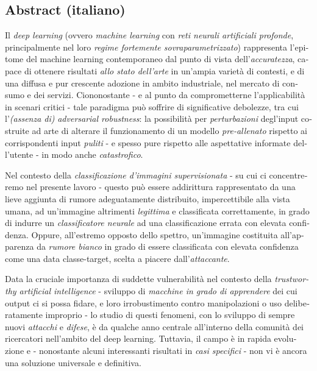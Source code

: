 
\begin{otherlanguage}{italian}

\newpage
\subsection{Abstract (italiano)}

Il \textit{deep learning} (ovvero \textit{machine learning} con \textit{reti neurali artificiali profonde}, principalmente nel loro \textit{regime fortemente sovraparametrizzato}) rappresenta l'epitome del machine learning contemporaneo dal punto di vista dell'\textit{accuratezza}, capace di ottenere risultati \textit{allo stato dell'arte} in un'ampia varietà di contesti, e di una diffusa e pur crescente adozione in ambito industriale, nel mercato di consumo e dei servizi. Ciononostante - e al punto da comprometterne l'applicabilità in scenari critici - tale paradigma può soffrire di significative debolezze, tra cui l'\textit{(assenza di)} \textit{adversarial robustness}: la possibilità per \textit{perturbazioni} degl'input costruite ad arte di alterare il funzionamento di un modello \textit{pre-allenato} rispetto ai corrispondenti input \textit{puliti} - e spesso pure rispetto alle aspettative informate dell'utente - in modo anche \textit{catastrofico}.

Nel contesto della \textit{classificazione d'immagini supervisionata} - su cui ci concentreremo nel presente lavoro - questo può essere addirittura rappresentato da una lieve aggiunta di rumore adeguatamente distribuito, impercettibile alla vista umana, ad un'immagine altrimenti \textit{legittima} e classificata correttamente, in grado di indurre un \textit{classificatore neurale} ad una classificazione errata con elevata confidenza. Oppure, all'estremo opposto dello spettro, un'immagine costituita all'apparenza da \textit{rumore bianco} in grado di essere classificata con elevata confidenza come una data classe-target, scelta a piacere dall'\textit{attaccante}.

Data la cruciale importanza di suddette vulnerabilità nel contesto della \textit{trustworthy artificial intelligence} - sviluppo di \textit{macchine in grado di apprendere} dei cui output ci si possa fidare, e loro irrobustimento contro manipolazioni o uso deliberatamente improprio - lo studio di questi fenomeni, con lo sviluppo di sempre nuovi \textit{attacchi} e \textit{difese}, è da qualche anno centrale all'interno della comunità dei ricercatori nell'ambito del deep learning. Tuttavia, il campo è in rapida evoluzione e - nonostante alcuni interessanti risultati in \textit{casi specifici} - non vi è ancora una soluzione universale e definitiva.


\end{otherlanguage}
